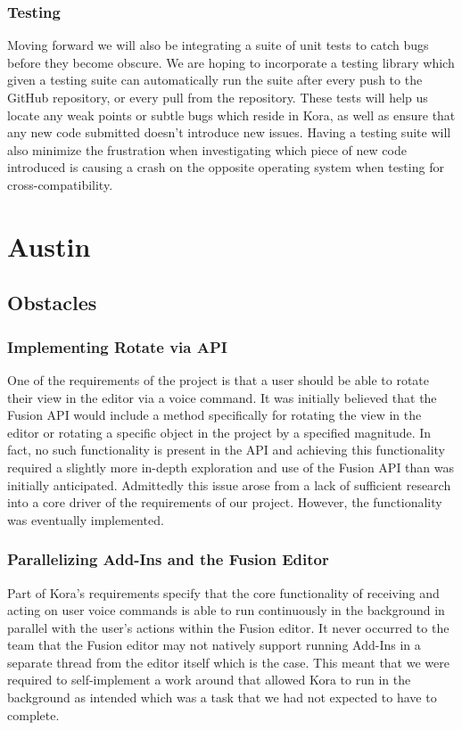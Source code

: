 \documentclass[onecolumn, draftclsnofoot,10pt, compsoc]{IEEEtran}
\begin{document}
		\subsubsection{Testing}
			Moving forward we will also be integrating a suite of unit tests to catch bugs before they become obscure.
			We are hoping to incorporate a testing library which given a testing suite can automatically run the suite after every push to the GitHub repository, or every pull from the repository.
			These tests will help us locate any weak points or subtle bugs which reside in Kora, as well as ensure that any new code submitted doesn't introduce new issues.
			Having a testing suite will also minimize the frustration when investigating which piece of new code introduced is causing a crash on the opposite operating system when testing for cross-compatibility.
			
		
	
	
	
	
	
	
\section{Austin}
    \subsection{Obstacles}
	    \subsubsection{Implementing Rotate via API}
		    One of the requirements of the project is that a user should be able to rotate their view in the editor via a voice command.
		    It was initially believed that the Fusion API would include a method specifically for rotating the view in the editor or rotating a specific object in the project by a specified magnitude.
		    In fact, no such functionality is present in the API and achieving this functionality required a slightly more in-depth exploration and use of the Fusion API than was initially anticipated.
		    Admittedly this issue arose from a lack of sufficient research into a core driver of the requirements of our project.
		    However, the functionality was eventually implemented.


   	 \subsubsection{Parallelizing Add-Ins and the Fusion Editor}
		    Part of Kora's requirements specify that the core functionality of receiving and acting on user voice commands is able to run continuously in the background in parallel with the user's actions within the Fusion editor.
		    It never occurred to the team that the Fusion editor may not natively support running Add-Ins in a separate thread from the editor itself which is the case.
		    This meant that we were required to self-implement a work around that allowed Kora to run in the background as intended which was a task that we had not expected to have to complete.
\end{document}
